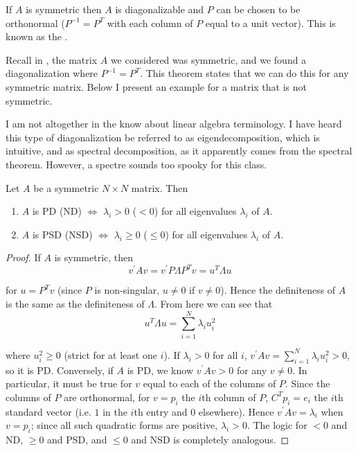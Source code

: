 \documentclass{article}
\begin{document}
\begin{theorem}
  If $A$ is symmetric then $A$ is diagonalizable and $P$ can be chosen to be orthonormal ($P^{-1} = P^T$ with each column of $P$ equal to a unit vector). This is known as the .
\end{theorem}

Recall in , the matrix $A$ we considered was symmetric, and we found a diagonalization where $P^{-1} = P^T$. This theorem states that we can do this for any symmetric matrix. Below I present an example for a matrix that is not symmetric.
\begin{remark}
  I am not altogether in the know about linear algebra terminology. I have heard this type of diagonalization be referred to as eigendecomposition, which is intuitive, and as spectral decomposition, as it apparently comes from the spectral theorem. However, a spectre sounds too spooky for this class.
\end{remark}

\begin{theorem}
  Let $A$ be a symmetric $N \times N$ matrix. Then
  \begin{enumerate}
    \item $A$ is PD (ND) $\iff$ $\lambda_i > 0$ ($< 0$) for all eigenvalues $\lambda_i$ of $A$.
    \item $A$ is PSD (NSD) $\iff$ $\lambda_i \ge 0$ ($\le 0$) for all eigenvalues $\lambda_i$ of $A$.
  \end{enumerate}
\end{theorem}

\begin{proof}
  If $A$ is symmetric, then
  \begin{equation}
    v^\prime A v = v^\prime P \Lambda P^T v = u^T \Lambda u
  \end{equation}

  for $u = P^T v$ (since $P$ is non-singular, $u \ne 0$ if $v \ne 0$). Hence the definiteness of $A$ is the same as the definiteness of $\Lambda$. From here we can see that
  \begin{equation}
    u^T \Lambda u = \sum^{N}_{i = 1} \lambda_i u_i^2
  \end{equation}

  where $u_i^2 \ge 0$ (strict for at least one $i$). If $\lambda_i > 0$ for all $i$, $v^\prime A v = \sum^{N}_{i = 1} \lambda_i u_i^2 > 0$, so it is PD. Conversely, if $A$ is PD, we know $v^\prime A v > 0$ for any $v \ne 0$. In particular, it must be true for $v$ equal to each of the columns of $P$. Since the columns of $P$ are orthonormal, for $v = p_i$ the $i$th column of $P$, $C^T p_i = e_i$ the $i$th standard vector (i.e. $1$ in the $i$th entry and $0$ elsewhere). Hence $v^\prime A v = \lambda_i$ when $v = p_i$; since all such quadratic forms are positive, $\lambda_i > 0$. The logic for $< 0$ and ND, $\ge 0$ and PSD, and $\le 0$ and NSD is completely analogous.
\end{proof}
\end{document}

